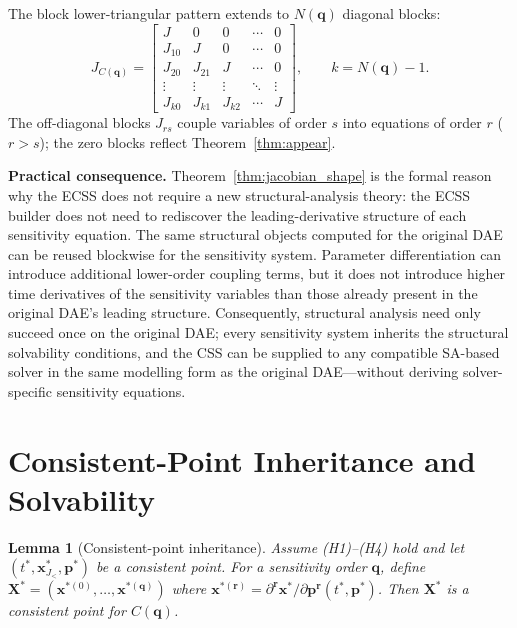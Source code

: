 \documentclass[12pt,a4paper]{article}
\theoremstyle{definition}
\theoremstyle{plain}
\newtheorem{lemma}[theorem]{Lemma}
\theoremstyle{remark}
\newcommand{\vx}{\mathbf{x}}
\newcommand{\vp}{\mathbf{p}}
\newcommand{\vq}{\mathbf{q}}
\newcommand{\vr}{\mathbf{r}}
\newcommand{\vX}{\mathbf{X}}
\begin{document}
The block lower-triangular pattern extends to $N(\vq)$ diagonal blocks:
\[
J_{C(\vq)} =
\begin{bmatrix}
J      & 0      & 0      & \cdots & 0 \\
J_{10} & J      & 0      & \cdots & 0 \\
J_{20} & J_{21} & J      & \cdots & 0 \\
\vdots & \vdots & \vdots & \ddots & \vdots \\
J_{k0} & J_{k1} & J_{k2} & \cdots & J
\end{bmatrix},
\qquad k = N(\vq)-1.
\]
The off-diagonal blocks $J_{rs}$ couple variables of order $s$ into equations of order $r$ ($r > s$); the zero blocks reflect Theorem~\ref{thm:appear}.

\smallskip\noindent
\textbf{Practical consequence.} Theorem~\ref{thm:jacobian_shape} is the formal reason why the ECSS does not require a new structural-analysis theory: the ECSS builder does not need to rediscover the leading-derivative structure of each sensitivity equation. The same structural objects computed for the original DAE can be reused blockwise for the sensitivity system. Parameter differentiation can introduce additional lower-order coupling terms, but it does not introduce higher time derivatives of the sensitivity variables than those already present in the original DAE's leading structure. Consequently, structural analysis need only succeed once on the original DAE; every sensitivity system inherits the structural solvability conditions, and the CSS can be supplied to any compatible SA-based solver in the same modelling form as the original DAE---without deriving solver-specific sensitivity equations.

\section{Consistent-Point Inheritance and Solvability}

\begin{lemma}[Consistent-point inheritance]
\label{lem:consistent}
Assume (H1)--(H4) hold and let $(t^*,\vx^*_{J_<},\vp^*)$ be a consistent point. For a sensitivity order $\vq$, define $\vX^* = (\vx^{*(0)},\dots,\vx^{*(\vq)})$ where $\vx^{*(\vr)} = \partial^{\vr}\vx^*/\partial\vp^{\vr}(t^*,\vp^*)$. Then $\vX^*$ is a consistent point for $C(\vq)$.
\end{lemma}
\end{document}
